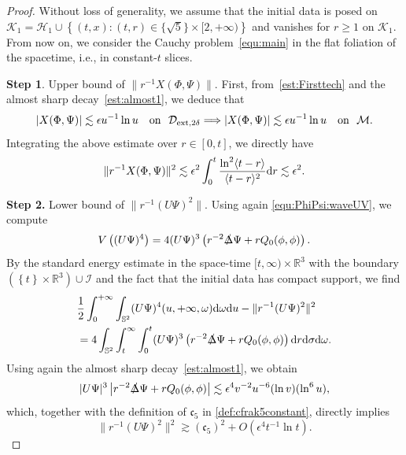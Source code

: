 \documentclass[a4paper,reqno]{amsart}
\theoremstyle{definition}
\numberwithin{equation}{section}
\def \R {{\mathbb{R} }}
\def \d {{\rm{d}}}
\def\cfrak{\mathfrak{c}}
\begin{document}
\begin{proof}
Without loss of generality, we assume that the initial data is posed on $\mathcal{K}_{1}=\mathcal{H}_{1}\cup\left\{(t,x):(t,r)\in \{\sqrt{5}\}\times [2,+\infty)\right\}$ and vanishes for $r\ge 1$ on $\mathcal{K}_{1}$. From now on, we consider the Cauchy problem~\eqref{equ:main} in the flat foliation of the spacetime, i.e., in constant-$t$ slices.

\smallskip
\textbf{Step 1}. Upper bound of $\|r^{-1} X(\Phi, \Psi)\|$.
First, from~\eqref{est:Firsttech} and the almost sharp decay~\eqref{est:almost1}, we deduce that 
\begin{equation*}
  |X(\Phi,\Psi)|\lesssim \epsilon u^{-1}\ln u\quad \mbox{on }\ \mathcal{D}_{\rm{ext},2\delta}\Longrightarrow 
  |X(\Phi,\Psi)|\lesssim \epsilon u^{-1}\ln u\quad \mbox{on }\  \mathcal{M}.
\end{equation*}
Integrating the above estimate over $r\in [0,t]$, we directly have 
\begin{align}\label{eq:X-upper}
    \|r^{-1} X(\Phi, \Psi)\|^2
    \lesssim \epsilon^{2} \int_{0}^{t}\frac{\ln^{2}\langle t-r\rangle}{\langle t-r\rangle^{2}}\d r
    \lesssim
    \epsilon^2.
\end{align}

\textbf{Step 2.} Lower bound of $\big\|r^{-1}(U \Psi)^2\big\|$.
Using again \eqref{equ:PhiPsi:waveUV}, we compute
\begin{equation*}
    V\left((U\Psi)^4\right) = 4 (U\Psi)^3 
    \left(r^{-2} \slashed{\Delta} \Psi + rQ_0(\phi, \phi) \right).
\end{equation*}
By the standard energy estimate in the space-time $[t,\infty)\times \R^{3}$ with the boundary $(\left\{t\right\}\times \R^{3})\cup \mathcal{I}$ and the fact that the initial data has compact support, we find 
\begin{equation*}
\begin{aligned}
   &\frac{1}{2}\int_{0}^{+\infty}\int_{\mathbb{S}^{2}}(U\Psi)^{4}(u,+\infty,\omega)\d \omega\d u -\|r^{-1}(U\Psi)^{2}\|^{2}\\
   &=4\int_{\mathbb{S}^{2}}\int_{t}^{\infty}\int_{0}^{t}(U\Psi)^{3}
    \left(r^{-2} \slashed{\Delta} \Psi + rQ_0(\phi, \phi) \right)\d r \d \sigma \d \omega.
   \end{aligned}
\end{equation*}
Using again the almost sharp decay~\eqref{est:almost1}, we obtain
\begin{equation*}
    |U\Psi|^{3} \left|r^{-2} \slashed{\Delta} \Psi + rQ_0(\phi, \phi) \right|
    \lesssim \epsilon^{4}v^{-2}u^{-6}(\ln v)(\ln^{6}u),
\end{equation*}
which, together with the definition of $\cfrak_5$ in \eqref{def:cfrak5constant}, directly implies 
\begin{equation}\label{eq:U-Psi-lower}
    \|r^{-1} (U\Psi)^2\|^2 \gtrsim (\mathfrak{c}_{5})^{2}+O(\epsilon^{4}t^{-1}\ln t).
\end{equation}


\end{proof}
\end{document}
